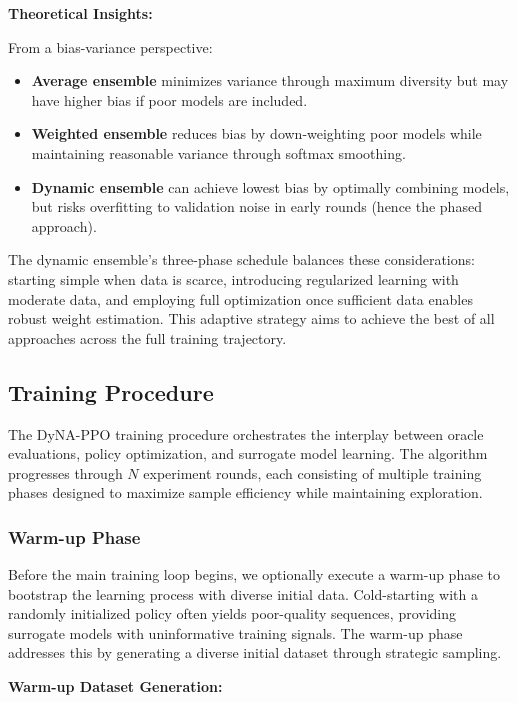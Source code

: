 \documentclass[conference]{IEEEtran}
\begin{document}
\textbf{Theoretical Insights:}

From a bias-variance perspective:
\begin{itemize}
    \item \textbf{Average ensemble} minimizes variance through maximum diversity but may have higher bias if poor models are included.
    \item \textbf{Weighted ensemble} reduces bias by down-weighting poor models while maintaining reasonable variance through softmax smoothing.
    \item \textbf{Dynamic ensemble} can achieve lowest bias by optimally combining models, but risks overfitting to validation noise in early rounds (hence the phased approach).
\end{itemize}

The dynamic ensemble's three-phase schedule balances these considerations: starting simple when data is scarce, introducing regularized learning with moderate data, and employing full optimization once sufficient data enables robust weight estimation. This adaptive strategy aims to achieve the best of all approaches across the full training trajectory.





\subsection{Training Procedure}

The DyNA-PPO training procedure orchestrates the interplay between oracle evaluations, policy optimization, and surrogate model learning. The algorithm progresses through $N$ experiment rounds, each consisting of multiple training phases designed to maximize sample efficiency while maintaining exploration.

\subsubsection{Warm-up Phase}

Before the main training loop begins, we optionally execute a warm-up phase to bootstrap the learning process with diverse initial data. Cold-starting with a randomly initialized policy often yields poor-quality sequences, providing surrogate models with uninformative training signals. The warm-up phase addresses this by generating a diverse initial dataset through strategic sampling.

\textbf{Warm-up Dataset Generation:}
\end{document}
